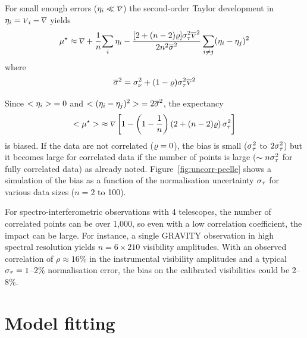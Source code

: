 \documentclass{pasa}
\begin{document}
For small enough errors ($\eta_i \ll \overline{{\scriptstyle V}}$) the second-order Taylor development in $\eta_i = {\scriptstyle V}_i - \overline{{\scriptstyle V}}$ yields 
\begin{equation}
    \mu^\star \approx  \overline{{\scriptstyle V}} 
                  +\frac1n {\sum\limits_i \eta_i}
                       - \frac {[2 + (n - 2)\varrho]\sigma_\tau^2\overline{{\scriptstyle V}}^2
                          }{
                           2n^2 \overline{\sigma}^2             
                          }
                           \sum\limits_{i\ne j} (\eta_i-\eta_j)^2
\end{equation}
where
\begin{equation}
    \overline{\sigma}^2 = \sigma_\nu^2+(1-\varrho)\sigma_\tau^2\overline{{\scriptstyle V}}^2 
\end{equation}

Since $ {<\eta_i>}  = 0$ and $ {<(\eta_i-\eta_j)^2>}  = 2\overline{\sigma}^2$, the expectancy
\begin{equation}
     {<\ensuremath{\mu}^\star>}  \approx \overline{{\scriptstyle V}} 
            \left[ 1 -  
             \left(1-\frac1n\right)
             \left(2 + (n-2)\varrho\right)
              \sigma_\tau^2 \right]
\end{equation}
is biased.  If the data are not correlated ($\varrho = 0$), the bias is small
($\sigma_\tau^2$ to $2\sigma_\tau^2$) but it becomes large for correlated data if the number of points is large ($\sim n\sigma_\tau^2$ for fully correlated data) as \citet{DAG94} already noted. Figure~\ref{fig:uncorr-peelle} shows a simulation of the bias as a function of the normalisation uncertainty $\sigma_\tau$ for various data sizes ($n = 2$ to 100). 

For spectro-interferometric observations with 4 telescopes, the number of correlated points can be over 1,000, so even with a low correlation coefficient, the impact can be large. For instance, a single GRAVITY observation in high spectral resolution yields $n = 6 \times 210$ visibility amplitudes. With an observed correlation of $\rho \approx 16$\% in the instrumental visibility amplitudes \citep{KAM20} and a typical $\sigma_\tau = 1$--2\% normalisation error, the bias on the calibrated visibilities could be 2--8\%.  

\section{Model fitting}
\label{sec:model}
\end{document}
